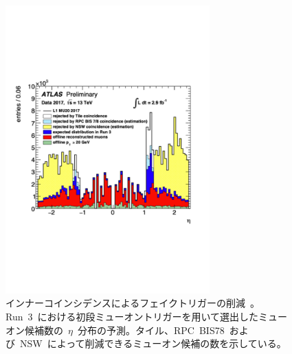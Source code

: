 \begin{figure}[H]
        \centering   
        \includegraphics[width=0.7\textwidth,page=1]{img/pdf/inner.pdf}
        \caption[インナーコインシデンスによるフェイクトリガーの削減]{インナーコインシデンスによるフェイクトリガーの削減~\cite{TR:06}。Run~3~における初段ミューオントリガーを用いて選出したミューオン候補数の~$\eta$~分布の予測。タイル、RPC~BIS78~および~NSW~によって削減できるミューオン候補の数を示している。}
        \label{fig:innercoin}
\end{figure}

